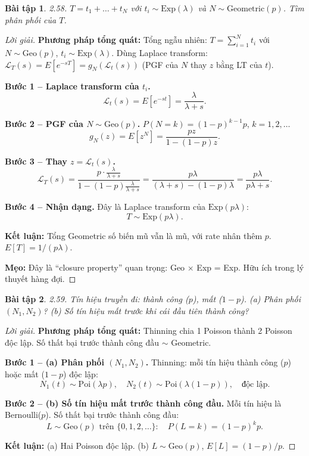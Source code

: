 \documentclass[8pt,a4paper]{article}
\newtheorem{exercise}{Bài tập}
\newenvironment{solution}{\begin{proof}[Lời giải]}{\end{proof}}
\begin{document}
\begin{exercise}
2.58. $T = t_1 + \dots + t_N$ với $t_i \sim \text{Exp}(\lambda)$ và $N \sim \text{Geometric}(p)$. Tìm phân phối của $T$.
\end{exercise}
\begin{solution}
\textbf{Phương pháp tổng quát:} Tổng ngẫu nhiên: $T = \sum_{i=1}^N t_i$ với $N \sim \text{Geo}(p)$, $t_i \sim \text{Exp}(\lambda)$. Dùng Laplace transform: $\mathcal{L}_T(s) = E[e^{-sT}] = g_N(\mathcal{L}_t(s))$ (PGF của $N$ thay $z$ bằng LT của $t$).

\textbf{Bước 1 -- Laplace transform của $t_i$.}
\[
  \mathcal{L}_t(s) = E[e^{-st}] = \frac{\lambda}{\lambda+s}.
\]

\textbf{Bước 2 -- PGF của $N \sim \text{Geo}(p)$.} $P(N=k) = (1-p)^{k-1}p$, $k = 1, 2, \ldots$
\[
  g_N(z) = E[z^N] = \frac{pz}{1-(1-p)z}.
\]

\textbf{Bước 3 -- Thay $z = \mathcal{L}_t(s)$.}
\[
  \mathcal{L}_T(s) = \frac{p \cdot \frac{\lambda}{\lambda+s}}{1 - (1-p)\frac{\lambda}{\lambda+s}} = \frac{p\lambda}{(\lambda+s) - (1-p)\lambda} = \frac{p\lambda}{p\lambda + s}.
\]

\textbf{Bước 4 -- Nhận dạng.} Đây là Laplace transform của $\text{Exp}(p\lambda)$:
\[
  \boxed{T \sim \text{Exp}(p\lambda)}.
\]

\textbf{Kết luận:} Tổng Geometric số biến mũ vẫn là mũ, với rate nhân thêm $p$. $E[T] = 1/(p\lambda)$.

\textbf{Mẹo:} Đây là ``closure property'' quan trọng: Geo $\times$ Exp = Exp. Hữu ích trong lý thuyết hàng đợi.
\end{solution}

\begin{exercise}
2.59. Tín hiệu truyền đi: thành công ($p$), mất ($1-p$).
(a) Phân phối $(N_1, N_2)$? (b) Số tín hiệu mất trước khi cái đầu tiên thành công?
\end{exercise}
\begin{solution}
\textbf{Phương pháp tổng quát:} Thinning chia 1 Poisson thành 2 Poisson độc lập. Số thất bại trước thành công đầu $\sim$ Geometric.

\textbf{Bước 1 -- (a) Phân phối $(N_1, N_2)$.} Thinning: mỗi tín hiệu thành công ($p$) hoặc mất ($1-p$) độc lập:
\[
  \boxed{N_1(t) \sim \text{Poi}(\lambda p), \quad N_2(t) \sim \text{Poi}(\lambda(1-p)), \quad \text{độc lập}}.
\]

\textbf{Bước 2 -- (b) Số tín hiệu mất trước thành công đầu.} Mỗi tín hiệu là Bernoulli($p$). Số thất bại trước thành công đầu:
\[
  \boxed{L \sim \text{Geo}(p) \text{ trên } \{0,1,2,\ldots\}: \quad P(L=k) = (1-p)^k p}.
\]

\textbf{Kết luận:} (a) Hai Poisson độc lập. (b) $L \sim \text{Geo}(p)$, $E[L] = (1-p)/p$.
\end{solution}
\end{document}
